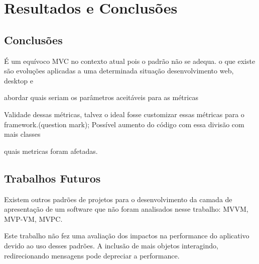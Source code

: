 \chapter{Resultados e Conclusões}

\section{Conclusões}

É um equívoco MVC no contexto atual pois o padrão não se adequa. o que existe
são evoluções aplicadas a uma determinada situação desenvolvimento web, desktop
e 

abordar quais seriam os parâmetros aceitáveis para as métricas

Validade dessas métricas, talvez o ideal fosse customizar essas métricas para o
framework.(question mark);
Possível aumento do código com essa divisão com mais classes

quais metricas foram afetadas.

\section{Trabalhos Futuros}

Existem outros padrões de projetos para o desenvolvimento da camada de
apresentação de um software que não foram analisados nesse trabalho: MVVM,
MVP-VM, MVPC.

Este trabalho não fez uma avaliação dos impactos na performance do aplicativo
devido ao uso desses padrões. A inclusão de mais objetos interagindo,
redirecionando mensagens pode depreciar a performance.
